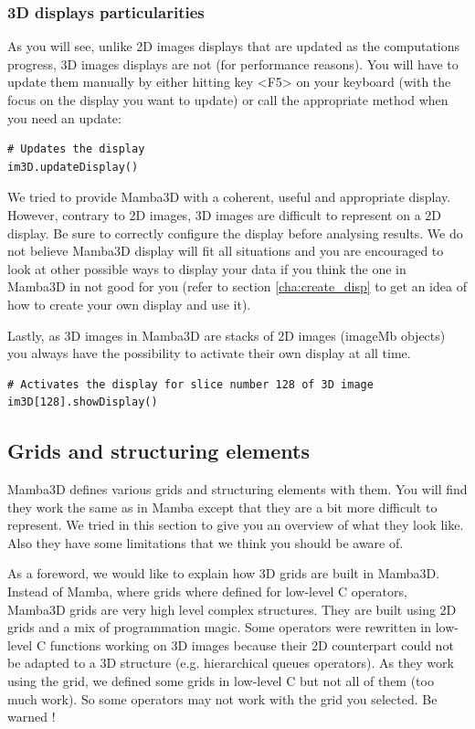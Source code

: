 \documentclass[a4paper,10pt,oneside]{article}
\begin{document}
\subsubsection{3D displays particularities}
As you will see, unlike 2D images displays that are updated as the computations
progress, 3D images displays are not (for performance reasons). You will have
to update them manually by either hitting key <F5> on your keyboard (with
the focus on the display you want to update) or call the appropriate method
when you need an update:

\lstset{language=Python}
\begin{lstlisting}
# Updates the display
im3D.updateDisplay()
\end{lstlisting}

We tried to provide Mamba3D with a coherent, useful and appropriate display.
However, contrary to 2D images, 3D images are difficult to represent on a 2D
display. Be sure to correctly configure the display before analysing results.
We do not believe Mamba3D display will fit all situations and you are
encouraged to look at other possible ways to display your data if you
think the one in Mamba3D in not good for you (refer to section \ref{cha:create_disp}
to get an idea of how to create your own display and use it).

Lastly, as 3D images in Mamba3D are stacks of 2D images (imageMb objects) you 
always have the possibility to activate their own display at all time.

\lstset{language=Python}
\begin{lstlisting}
# Activates the display for slice number 128 of 3D image
im3D[128].showDisplay()
\end{lstlisting}

\subsection{Grids and structuring elements}

Mamba3D defines various grids and structuring elements with them. You will
find they work the same as in Mamba except that they are a bit more
difficult to represent. We tried in this section to give you an overview
of what they look like. Also they have some limitations that we think you
should be aware of.

As a foreword, we would like to explain how 3D grids are built in Mamba3D.
Instead of Mamba, where grids where defined for low-level C operators, Mamba3D
grids are very high level complex structures. They are built using 2D grids and
a mix of programmation magic. Some operators were rewritten in low-level C
functions working on 3D images because their 2D counterpart could not be adapted
to a 3D structure (e.g. hierarchical queues operators). As they work using the
grid, we defined some grids in low-level C but not all of them (too much work).
So some operators may not work with the grid you selected. Be warned !
\end{document}
